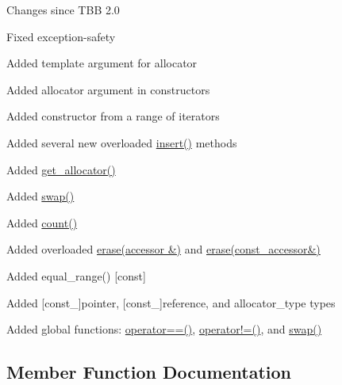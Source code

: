 \begin{DoxyParagraph}{Changes since T\+B\+B 2.0}

\begin{DoxyItemize}
\item Fixed exception-\/safety
\item Added template argument for allocator
\item Added allocator argument in constructors
\item Added constructor from a range of iterators
\item Added several new overloaded \hyperlink{classtbb_1_1interface5_1_1concurrent__hash__map_ae20cd9cdb08def2bcb2fd86c8276f52b}{insert()} methods
\item Added \hyperlink{classtbb_1_1interface5_1_1concurrent__hash__map_ad4993bc44e0c923f2e8430d81367889d}{get\+\_\+allocator()}
\item Added \hyperlink{classtbb_1_1interface5_1_1concurrent__hash__map_a4c8edf603bc776a6c84c007702c1808e}{swap()}
\item Added \hyperlink{classtbb_1_1interface5_1_1concurrent__hash__map_a7f9cb611a5effb650959cdde1b8ee901}{count()}
\item Added overloaded \hyperlink{classtbb_1_1interface5_1_1concurrent__hash__map_ae8ae6006f9756f3bfd9b5d4407250ada}{erase(accessor \&)} and \hyperlink{classtbb_1_1interface5_1_1concurrent__hash__map_a52cd8c021eab3d09e75383064ca7d80a}{erase(const\+\_\+accessor\&)}
\item Added equal\+\_\+range() \mbox{[}const\mbox{]}
\item Added \mbox{[}const\+\_\+\mbox{]}pointer, \mbox{[}const\+\_\+\mbox{]}reference, and allocator\+\_\+type types
\item Added global functions\+: \hyperlink{group__SmartPointerGroup_ga6367f7dd2ba62b272c7a14b2d5db3e01}{operator==()}, \hyperlink{group__SmartPointerGroup_ga4737a73b3c8d0a42d5f1f94526728f75}{operator!=()}, and \hyperlink{classtbb_1_1interface5_1_1concurrent__hash__map_a4c8edf603bc776a6c84c007702c1808e}{swap()} 
\end{DoxyItemize}
\end{DoxyParagraph}


\subsection{Member Function Documentation}
\hypertarget{classtbb_1_1interface5_1_1concurrent__hash__map_a5144122dbb946d933b94a92117543b33}{}
